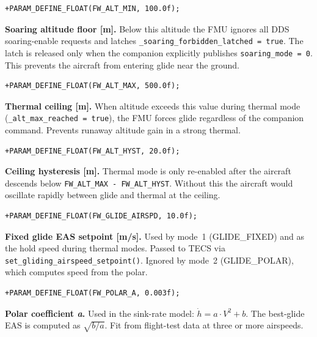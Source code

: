 \documentclass[12pt,a4paper]{article}
\begin{document}
\begin{lstlisting}[style=diff]
+PARAM_DEFINE_FLOAT(FW_ALT_MIN, 100.0f);
\end{lstlisting}
\begin{annotation}\textbf{Soaring altitude floor [m].} Below this altitude the FMU ignores all DDS soaring-enable requests and latches \texttt{\_soaring\_forbidden\_latched = true}. The latch is released only when the companion explicitly publishes \texttt{soaring\_mode = 0}. This prevents the aircraft from entering glide near the ground.\end{annotation}

\begin{lstlisting}[style=diff]
+PARAM_DEFINE_FLOAT(FW_ALT_MAX, 500.0f);
\end{lstlisting}
\begin{annotation}\textbf{Thermal ceiling [m].} When altitude exceeds this value during thermal mode (\texttt{\_alt\_max\_reached = true}), the FMU forces glide regardless of the companion command. Prevents runaway altitude gain in a strong thermal.\end{annotation}

\begin{lstlisting}[style=diff]
+PARAM_DEFINE_FLOAT(FW_ALT_HYST, 20.0f);
\end{lstlisting}
\begin{annotation}\textbf{Ceiling hysteresis [m].} Thermal mode is only re-enabled after the aircraft descends below \texttt{FW\_ALT\_MAX - FW\_ALT\_HYST}. Without this the aircraft would oscillate rapidly between glide and thermal at the ceiling.\end{annotation}

\begin{lstlisting}[style=diff]
+PARAM_DEFINE_FLOAT(FW_GLIDE_AIRSPD, 10.0f);
\end{lstlisting}
\begin{annotation}\textbf{Fixed glide EAS setpoint [m/s].} Used by mode~1 (GLIDE\_FIXED) and as the hold speed during thermal modes. Passed to TECS via \texttt{set\_gliding\_airspeed\_setpoint()}. Ignored by mode~2 (GLIDE\_POLAR), which computes speed from the polar.\end{annotation}

\begin{lstlisting}[style=diff]
+PARAM_DEFINE_FLOAT(FW_POLAR_A, 0.003f);
\end{lstlisting}
\begin{annotation}\textbf{Polar coefficient \textit{a}.} Used in the sink-rate model: $\dot{h} = a \cdot V^2 + b$. The best-glide EAS is computed as $\sqrt{b/a}$. Fit from flight-test data at three or more airspeeds.\end{annotation}
\end{document}
